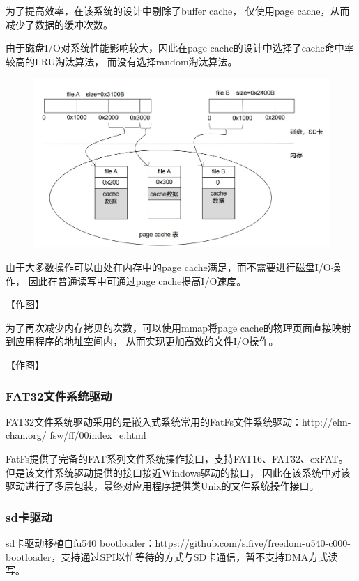 \documentclass[UTF8,a4paper,10pt]{ctexart}
\begin{document}
为了提高效率，在该系统的设计中剔除了buffer cache，
仅使用page cache，从而减少了数据的缓冲次数。

由于磁盘I/O对系统性能影响较大，因此在page cache的设计中选择了cache命中率较高的LRU淘汰算法，
而没有选择random淘汰算法。

\begin{figure}[H]
  \centering
  \includegraphics[scale=0.5]{image/file04.jpg}
\end{figure}

由于大多数操作可以由处在内存中的page cache满足，而不需要进行磁盘I/O操作，
因此在普通读写中可通过page cache提高I/O速度。

【作图】

为了再次减少内存拷贝的次数，可以使用mmap将page cache的物理页面直接映射到应用程序的地址空间内，
从而实现更加高效的文件I/O操作。

【作图】

\subsubsection{FAT32文件系统驱动}

FAT32文件系统驱动采用的是嵌入式系统常用的FatFs文件系统驱动：http://elm-chan.org/
fsw/ff/00index\_e.html

FatFs提供了完备的FAT系列文件系统操作接口，支持FAT16、FAT32、exFAT。
但是该文件系统驱动提供的接口接近Windows驱动的接口，
因此在该系统中对该驱动进行了多层包装，最终对应用程序提供类Unix的文件系统操作接口。

\subsubsection{sd卡驱动}

sd卡驱动移植自fu540 bootloader：https://github.com/sifive/freedom-u540-c000-bootloader，支持通过SPI以忙等待的方式与SD卡通信，暂不支持DMA方式读写。
\end{document}
